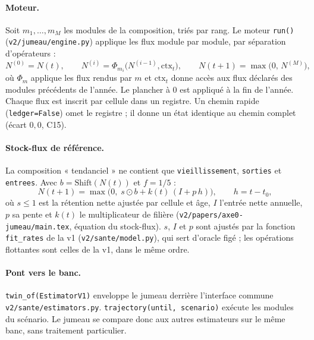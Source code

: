 \paragraph{Moteur.} Soit $m_1, \dots, m_M$ les modules de la composition, triés par rang. Le moteur
\texttt{run()} (\texttt{v2/jumeau/engine.py}) applique les flux module par module, par séparation d'opérateurs :
\begin{equation}\label{jum:eq:moteur}
  N^{(0)} = N(t), \qquad N^{(i)} = \Phi_{m_i}\bigl(N^{(i-1)}, \mathrm{ctx}_t\bigr), \qquad
  N(t+1) = \max\bigl(0,\, N^{(M)}\bigr),
\end{equation}
où $\Phi_{m}$ applique les flux rendus par $m$ et $\mathrm{ctx}_t$ donne accès aux flux déclarés des modules
précédents de l'année. Le plancher à 0 est appliqué à la fin de l'année. Chaque flux est inscrit par cellule
dans un registre. Un chemin rapide (\texttt{ledger=False}) omet le registre ; il donne un état identique au
chemin complet (écart $0{,}0$\mesure{}, C15).

\paragraph{Stock-flux de référence.} La composition « tendanciel » ne contient que \texttt{vieillissement},
\texttt{sorties} et \texttt{entrees}. Avec $b = \mathrm{Shift}(N(t))$ et $f = 1/5$\suppose{} :
\begin{equation}\label{jum:eq:stockflux}
  N(t+1) = \max\bigl(0,\; s \odot b + k(t)\,(I + p\,h)\bigr), \qquad h = t - t_0,
\end{equation}
où $s \le 1$ est la rétention nette ajustée par cellule et âge, $I$ l'entrée nette annuelle, $p$ sa pente et
$k(t)$ le multiplicateur de filière (\texttt{v2/papers/axe0-jumeau/main.tex}, équation du stock-flux). $s$, $I$
et $p$ sont ajustés par la fonction \texttt{fit\_rates} de la v1 (\texttt{v2/sante/model.py}), qui sert
d'oracle figé ; les opérations flottantes sont celles de la v1, dans le même ordre.

\paragraph{Pont vers le banc.} \texttt{twin\_of(EstimatorV1)} enveloppe le jumeau derrière l'interface commune
\texttt{v2/sante/estimators.py}. \texttt{trajectory(until, scenario)} exécute les modules du scénario. Le
jumeau se compare donc aux autres estimateurs sur le même banc, sans traitement particulier.

